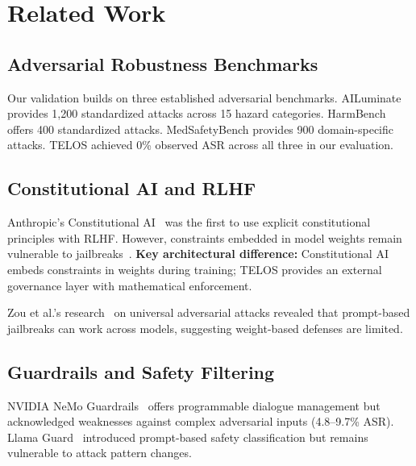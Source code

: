 \documentclass[11pt,twocolumn]{article}
\begin{document}
\section{Related Work}

\subsection{Adversarial Robustness Benchmarks}

Our validation builds on three established adversarial benchmarks. AILuminate provides 1,200 standardized attacks across 15 hazard categories. HarmBench offers 400 standardized attacks. MedSafetyBench provides 900 domain-specific attacks. TELOS achieved 0\% observed ASR across all three in our evaluation.

\subsection{Constitutional AI and RLHF}

Anthropic's Constitutional AI~\citep{bai2022constitutional} was the first to use explicit constitutional principles with RLHF. However, constraints embedded in model weights remain vulnerable to jailbreaks~\citep{wei2023jailbroken}. \textbf{Key architectural difference:} Constitutional AI embeds constraints in weights during training; TELOS provides an external governance layer with mathematical enforcement.

Zou et al.'s research~\citep{zou2023universal} on universal adversarial attacks revealed that prompt-based jailbreaks can work across models, suggesting weight-based defenses are limited.

\subsection{Guardrails and Safety Filtering}

NVIDIA NeMo Guardrails~\citep{rebedea2023nemo} offers programmable dialogue management but acknowledged weaknesses against complex adversarial inputs (4.8--9.7\% ASR). Llama Guard~\citep{inan2023llamaguard} introduced prompt-based safety classification but remains vulnerable to attack pattern changes.

\end{document}
